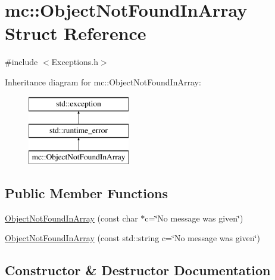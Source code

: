 \hypertarget{structmc_1_1_object_not_found_in_array}{}\section{mc\+:\+:Object\+Not\+Found\+In\+Array Struct Reference}
\label{structmc_1_1_object_not_found_in_array}


{\ttfamily \#include $<$Exceptions.\+h$>$}

Inheritance diagram for mc\+:\+:Object\+Not\+Found\+In\+Array\+:\begin{figure}[H]
\begin{center}
\leavevmode
\includegraphics[height=3.000000cm]{de/d0d/structmc_1_1_object_not_found_in_array}
\end{center}
\end{figure}
\subsection*{Public Member Functions}
\begin{DoxyCompactItemize}
\item 
\hyperlink{structmc_1_1_object_not_found_in_array_accc8985a7187fbcf5fc78527bb17ac67}{Object\+Not\+Found\+In\+Array} (const char $\ast$c=\char`\"{}No message was given\char`\"{})
\item 
\hyperlink{structmc_1_1_object_not_found_in_array_a3c5cd8e08030600a0c2bde64fada71cc}{Object\+Not\+Found\+In\+Array} (const std\+::string c=\char`\"{}No message was given\char`\"{})
\end{DoxyCompactItemize}


\subsection{Constructor \& Destructor Documentation}
